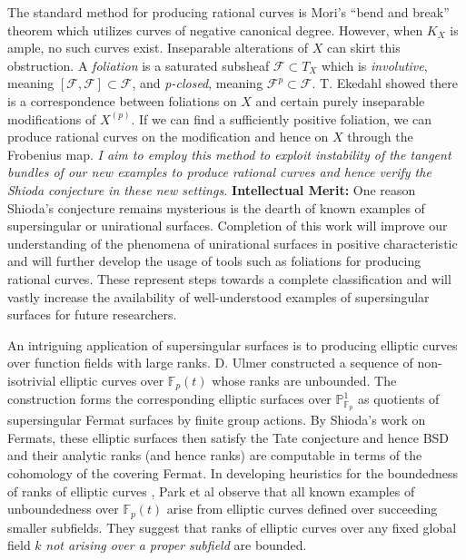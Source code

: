 \documentclass[11pt]{article}
\newcommand{\F}{\mathcal{F}}
\newcommand{\FF}{\mathbb{F}}
\renewcommand{\P}{\mathbb{P}}
\begin{document}
The standard method for producing rational curves is Mori's ``bend and break'' theorem which utilizes curves of negative canonical degree. However, when $K_X$ is ample, no such curves exist. Inseparable alterations of $X$ can skirt this obstruction. A \textit{foliation} is a saturated subsheaf $\F \subset T_X$ which is \textit{involutive}, meaning $[\F, \F] \subset \F$, and \textit{p-closed}, meaning $\F^p \subset \F$. T. Ekedahl showed  there is a correspondence between foliations on $X$ and certain purely inseparable modifications of $X^{(p)}$. If we can find a sufficiently positive foliation, we can produce rational curves on the modification and hence on $X$ through the Frobenius map. \emph{I aim to employ this method to exploit instability of the tangent bundles of our new examples to produce rational curves and hence verify the Shioda conjecture in these new settings.}
\newline
\noindent
\textbf{Intellectual Merit:}
One reason Shioda's conjecture remains mysterious is the dearth of known examples of supersingular or unirational surfaces. Completion of this work will improve our understanding of the phenomena of unirational surfaces in positive characteristic and will further develop the usage of tools such as foliations for producing rational curves. These represent steps towards a complete classification and will vastly increase the availability of well-understood examples of supersingular surfaces for future researchers.
\par
An intriguing application of supersingular surfaces is to producing elliptic curves over function fields with large ranks. D. Ulmer constructed  a sequence of non-isotrivial elliptic curves over $\FF_p(t)$ whose ranks are unbounded. The construction forms the corresponding elliptic surfaces over $\P^1_{\FF_p}$ as quotients of supersingular Fermat surfaces by finite group actions. By Shioda's work on Fermats, these elliptic surfaces then satisfy the Tate conjecture and hence BSD and their analytic ranks (and hence ranks) are computable in terms of the cohomology of the covering Fermat. In developing heuristics for the boundedness of ranks of elliptic curves , Park et al observe that all known examples of unboundedness over $\FF_p(t)$ arise from elliptic curves defined over succeeding smaller subfields. They suggest that ranks of elliptic curves over any fixed global field $k$ \textit{not arising over a proper subfield} are bounded. 
\par
\end{document}
